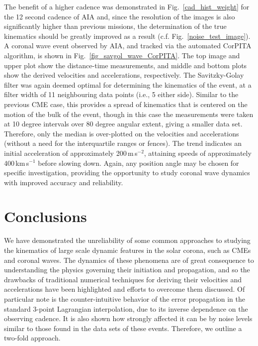 \documentclass[referee]{aa}
\begin{document}
The benefit of a higher cadence was demonstrated in Fig.~\ref{cad_hist_weight} for the 12 second cadence of AIA and, since the resolution of the images is also significantly higher than previous missions, the determination of the true kinematics should be greatly improved as a result (c.f. Fig.~\ref{noise_test_image}). A coronal wave event observed by AIA, and tracked via the automated CorPITA algorithm, is shown in Fig.~\ref{fig_savgol_wave_CorPITA}. The top image and upper plot show the distance-time measurements, and middle and bottom plots show the derived velocities and accelerations, respectively. The Savitzky-Golay filter was again deemed optimal for determining the kinematics of the event, at a filter width of 11 neighbouring data points (i.e., 5 either side). Similar to the previous CME case, this provides a spread of kinematics that is centered on the motion of the bulk of the event, though in this case the measurements were taken at 10 degree intervals over 80 degree angular extent, giving a smaller data set. Therefore, only the median is over-plotted on the velocities and accelerations (without a need for the interquartile ranges or fences). The trend indicates an initial acceleration of approximately 200\,m\,s$^{-2}$, attaining speeds of approximately 400\,km\,s$^{-1}$ before slowing down. Again, any position angle may be chosen for specific investigation, providing the opportunity to study coronal wave dynamics with improved accuracy and reliability.


\section{Conclusions}
\label{sect:conclusions}

We have demonstrated the unreliability of some common approaches to studying the kinematics of large scale dynamic features in the solar corona, such as CMEs and coronal waves. The dynamics of these phenomena are of great consequence to understanding the physics governing their initiation and propagation, and so the drawbacks of traditional numerical techniques for deriving their velocities and accelerations have been highlighted and efforts to overcome them discussed. Of particular note is the counter-intuitive behavior of the error propagation in the standard 3-point Lagrangian interpolation, due to its inverse dependence on the observing cadence. It is also shown how strongly affected it can be by noise levels similar to those found in the data sets of these events. Therefore, we outline a two-fold approach.
\end{document}
